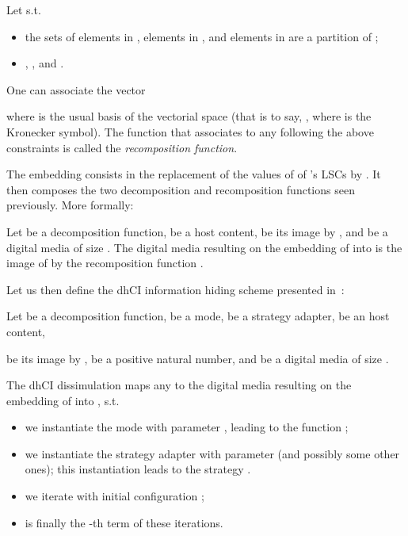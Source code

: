 \documentclass{comjnl}
\begin{document}
\begin{definition}[Recomposition]
Let 
 s.t.
\begin{itemize}
\item the sets of elements in , elements in , and 
elements in  are a partition of ;
\item , , and .  
\end{itemize}
One can associate the vector 

\noindent where 
 is the usual basis of the vectorial space  (that is to say, , where  is the Kronecker symbol).
The function that associates  to any 
 following the above constraints 
is called the \emph{recomposition function}.
\end{definition}

The embedding consists in the replacement of the values of 
 of 's LSCs  by . 
It then composes the two decomposition and
recomposition functions seen previously. More formally:


\begin{definition}
Let  be a decomposition function,
 be a host content,
 be its image by , 
and  be a digital media of size .
The digital media  resulting on the embedding of  into  is 
the image of 
by  the recomposition function .
\end{definition}

Let us then define the dhCI information hiding scheme
presented in~\cite{gfb10:ip}:

\begin{definition}
 \label{def:dhCI}
Let  be a decomposition function,
 be a mode, 
 be a strategy adapter,
 be an host content,\linebreak
 
be its image by ,
 be a positive natural number,  
and  be a digital media of size .


The dhCI dissimulation  maps any
  to the digital media  resulting on the embedding of
 into , s.t.

\begin{itemize}
\item we instantiate the mode  with parameter , leading to 
  the function ;
\item we instantiate the strategy adapter  
with parameter  (and possibly some other ones);
this instantiation leads to the strategy .

\item we iterate  with initial configuration ;
\item  is finally the -th term of these iterations.
\end{itemize}
\end{definition}
\end{document}
